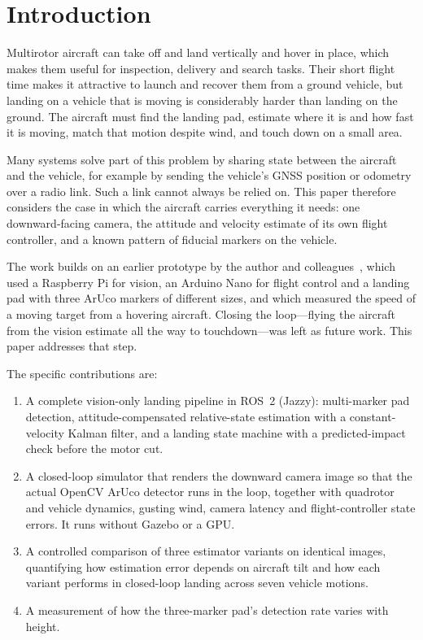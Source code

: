 \documentclass[conference]{IEEEtran}
\begin{document}
\section{Introduction}

Multirotor aircraft can take off and land vertically and hover in place, which makes them
useful for inspection, delivery and search tasks. Their short flight time makes it attractive to
launch and recover them from a ground vehicle, but landing on a vehicle that is moving is
considerably harder than landing on the ground. The aircraft must find the landing pad,
estimate where it is and how fast it is moving, match that motion despite wind, and touch down
on a small area.

Many systems solve part of this problem by sharing state between the aircraft and the vehicle,
for example by sending the vehicle's GNSS position or odometry over a radio link. Such a link
cannot always be relied on. This paper therefore considers the case in which the aircraft
carries everything it needs: one downward-facing camera, the attitude and velocity estimate of
its own flight controller, and a known pattern of fiducial markers on the vehicle.

The work builds on an earlier prototype by the author and colleagues~\cite{wickramanayake2019landing},
which used a Raspberry Pi for vision, an Arduino Nano for flight control and a landing pad
with three ArUco markers of different sizes, and which measured the speed of a moving target
from a hovering aircraft. Closing the loop---flying the aircraft from the vision estimate all
the way to touchdown---was left as future work. This paper addresses that step.

The specific contributions are:
\begin{enumerate}
\item A complete vision-only landing pipeline in ROS~2 (Jazzy): multi-marker pad detection,
attitude-compensated relative-state estimation with a constant-velocity Kalman filter, and a
landing state machine with a predicted-impact check before the motor cut.
\item A closed-loop simulator that renders the downward camera image so that the actual
OpenCV ArUco detector runs in the loop, together with quadrotor and vehicle dynamics, gusting
wind, camera latency and flight-controller state errors. It runs without Gazebo or a GPU.
\item A controlled comparison of three estimator variants on identical images, quantifying how
estimation error depends on aircraft tilt and how each variant performs in closed-loop landing
across seven vehicle motions.
\item A measurement of how the three-marker pad's detection rate varies with height.
\end{enumerate}
\end{document}
